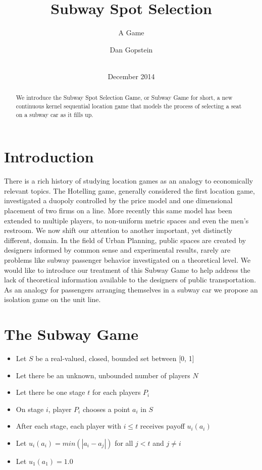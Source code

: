 \documentclass{acm_proc_article-sp}
\begin{document}
\title{Subway Spot Selection}
\subtitle{A Game}

\author{
\alignauthor
       Dan Gopstein\\
       \\
}

\date{December 2014}

\maketitle
\begin{abstract}
We introduce the Subway Spot Selection Game, or Subway Game for short, a new continuous kernel sequential location game that models the process of selecting a seat on a subway car as it fills up.
\end{abstract}

\section{Introduction}
There is a rich history of studying location games as an analogy to economically relevant topics. The Hotelling game\cite{hotelling1990stability}, generally considered the first location game, investigated a duopoly controlled by the price model and one dimensional placement of two firms on a line. More recently this same model has been extended to multiple players\cite{economides1993hotelling}, to non-uniform metric spaces\cite{zhao2008isolation} and even the men's restroom\cite{heufer2011washroom, kranakis2010urinal}.
\indent We now shift our attention to another important, yet distinctly different, domain. In the field of Urban Planning, public spaces are created by designers informed by common sense and experimental results, rarely are problems like subway passenger behavior investigated on a theoretical level. We would like to introduce our treatment of this Subway Game to help address the lack of theoretical information available to the designers of public transportation. As an analogy for passengers arranging themselves in a subway car we propose an isolation game on the unit line.

\section{The Subway Game}
\begin{itemize}
\item Let $S$ be a real-valued, closed, bounded set between [0, 1]
\item Let there be an unknown, unbounded number of players $N$
\item Let there be one stage $t$ for each players $P_i$
\item On stage $i$, player $P_i$ chooses a point $a_i$ in $S$
\item After each stage, each player with $i \leq t$ receives payoff $u_i(a_i)$
\item Let $u_i(a_i)=min(|a_i - a_j|)$ for all $j <  t$ and $j \neq i$
\item Let $u_1(a_1)=1.0$
\end{itemize}
\end{document}
